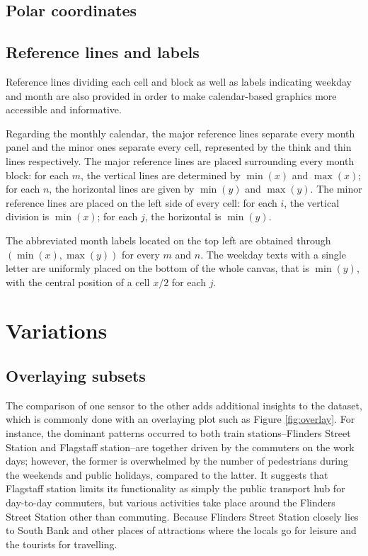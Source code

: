 \documentclass[article]{jss}
\begin{document}
\subsection{Polar coordinates}\label{polar-coordinates}

\subsection{Reference lines and
labels}\label{reference-lines-and-labels}

Reference lines dividing each cell and block as well as labels
indicating weekday and month are also provided in order to make
calendar-based graphics more accessible and informative.

Regarding the monthly calendar, the major reference lines separate every
month panel and the minor ones separate every cell, represented by the
think and thin lines respectively. The major reference lines are placed
surrounding every month block: for each \(m\), the vertical lines are
determined by \(\min{(x)}\) and \(\max{(x)}\); for each \(n\), the
horizontal lines are given by \(\min{(y)}\) and \(\max{(y)}\). The minor
reference lines are placed on the left side of every cell: for each
\(i\), the vertical division is \(\min{(x)}\); for each \(j\), the
horizontal is \(\min{(y)}\).

The abbreviated month labels located on the top left are obtained
through \((\min{(x)}, \max{(y)})\) for every \(m\) and \(n\). The
weekday texts with a single letter are uniformly placed on the bottom of
the whole canvas, that is \(\min{(y)}\), with the central position of a
cell \(x / 2\) for each \(j\).

\section{Variations}\label{variations}

\label{sec:examples}

\subsection{Overlaying subsets}\label{overlaying-subsets}

The comparison of one sensor to the other adds additional insights to
the dataset, which is commonly done with an overlaying plot such as
Figure \ref{fig:overlay}. For instance, the dominant patterns occurred
to both train stations--Flinders Street Station and Flagstaff
station--are together driven by the commuters on the work days; however,
the former is overwhelmed by the number of pedestrians during the
weekends and public holidays, compared to the latter. It suggests that
Flagstaff station limits its functionality as simply the public
transport hub for day-to-day commuters, but various activities take
place around the Flinders Street Station other than commuting. Because
Flinders Street Station closely lies to South Bank and other places of
attractions where the locals go for leisure and the tourists for
travelling.
\end{document}
